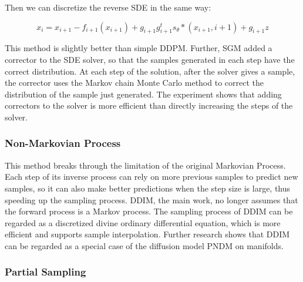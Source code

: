\documentclass[conference]{IEEEtran}
\begin{document}
Then we can discretize the reverse SDE in the same way:

\begin{equation}
    x_i=x_{i+1}-f_{i+1}(x_{i+1})+g_{i+1}g_{i+1}^ts_\theta * (x_{i+1},i+1)+g_{i+1}z
\end{equation}

This method is slightly better than simple DDPM. Further, SGM added a corrector to the SDE solver, so that the samples generated in each step have the correct distribution. At each step of the solution, after the solver gives a sample, the corrector uses the Markov chain Monte Carlo method to correct the distribution of the sample just generated. The experiment shows that adding correctors to the solver is more efficient than directly increasing the steps of the solver.

\subsubsection{Non-Markovian Process}\quad

This method breaks through the limitation of the original Markovian Process. Each step of its inverse process can rely on more previous samples to predict new samples, so it can also make better predictions when the step size is large, thus speeding up the sampling process. DDIM, the main work, no longer assumes that the forward process is a Markov process. The sampling process of DDIM can be regarded as a discretized divine ordinary differential equation, which is more efficient and supports sample interpolation. Further research shows that DDIM can be regarded as a special case of the diffusion model PNDM on manifolds.

\subsubsection{Partial Sampling}\quad
\end{document}
